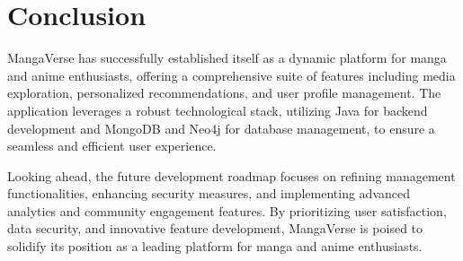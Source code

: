 \section{Conclusion}

MangaVerse has successfully established itself as a dynamic platform for manga and anime enthusiasts, offering 
a comprehensive suite of features including media exploration, personalized recommendations, and user profile 
management. The application leverages a robust technological stack, utilizing Java for backend development and 
MongoDB and Neo4j for database management, to ensure a seamless and efficient user experience.

\vspace{\baselineskip}

Looking ahead, the future development roadmap focuses on refining management functionalities, enhancing security 
measures, and implementing advanced analytics and community engagement features. By prioritizing user satisfaction,
data security, and innovative feature development, MangaVerse is poised to solidify its position as a leading 
platform for manga and anime enthusiasts.